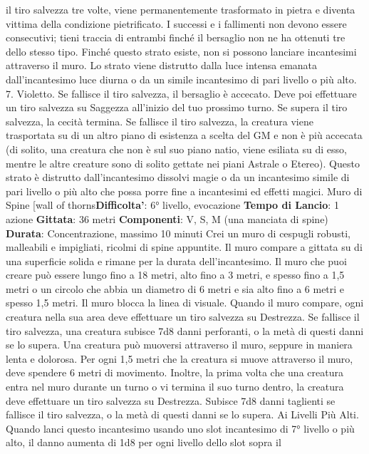 \begin{multicols}{2}
il tiro salvezza tre volte, viene permanentemente
trasformato in pietra e diventa vittima della condizione
pietrificato. I successi e i fallimenti non devono essere
consecutivi; tieni traccia di entrambi finché il bersaglio
non ne ha ottenuti tre dello stesso tipo.
Finché questo strato esiste, non si possono lanciare
incantesimi attraverso il muro. Lo strato viene distrutto
dalla luce intensa emanata dall’incantesimo luce diurna
o da un simile incantesimo di pari livello o più alto.
7. Violetto. Se fallisce il tiro salvezza, il bersaglio è
accecato. Deve poi effettuare un tiro salvezza su
Saggezza all’inizio del tuo prossimo turno. Se supera il
tiro salvezza, la cecità termina. Se fallisce il tiro
salvezza, la creatura viene trasportata su di un altro
piano di esistenza a scelta del GM e non è più accecata
(di solito, una creatura che non è sul suo piano natio,
viene esiliata su di esso, mentre le altre creature sono
di solito gettate nei piani Astrale o Etereo). Questo
strato è distrutto dall’incantesimo dissolvi magie o da un
incantesimo simile di pari livello o più alto che possa
porre fine a incantesimi ed effetti magici.
Muro di Spine
[wall of thorns\textbf{Difficolta'}:
6° livello, evocazione
\textbf{Tempo di Lancio}: 1 azione
\textbf{Gittata}: 36 metri
\textbf{Componenti}: V, S, M (una manciata di spine)
\textbf{Durata}: Concentrazione, massimo 10 minuti
Crei un muro di cespugli robusti, malleabili e impigliati,
ricolmi di spine appuntite. Il muro compare a gittata su
di una superficie solida e rimane per la durata
dell’incantesimo. Il muro che puoi creare può essere
lungo fino a 18 metri, alto fino a 3 metri, e spesso fino a
1,5 metri o un circolo che abbia un diametro di 6 metri e
sia alto fino a 6 metri e spesso 1,5 metri. Il muro blocca
la linea di visuale.
Quando il muro compare, ogni creatura nella sua area
deve effettuare un tiro salvezza su Destrezza. Se
fallisce il tiro salvezza, una creatura subisce 7d8 danni
perforanti, o la metà di questi danni se lo supera.
Una creatura può muoversi attraverso il muro, seppure
in maniera lenta e dolorosa. Per ogni 1,5 metri che la
creatura si muove attraverso il muro, deve spendere 6
metri di movimento. Inoltre, la prima volta che una
creatura entra nel muro durante un turno o vi termina il
suo turno dentro, la creatura deve effettuare un tiro
salvezza su Destrezza. Subisce 7d8 danni taglienti se
fallisce il tiro salvezza, o la metà di questi danni se lo
supera.
Ai Livelli Più Alti. Quando lanci questo incantesimo
usando uno slot incantesimo di 7° livello o più alto, il
danno aumenta di 1d8 per ogni livello dello slot sopra il

\end{multicols}
